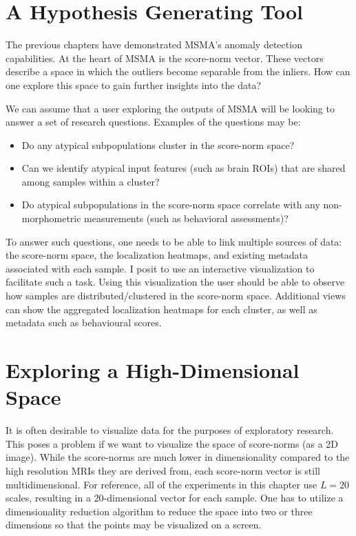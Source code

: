 \section{A Hypothesis Generating Tool}

The previous chapters have demonstrated MSMA's anomaly detection capabilities. At the heart of MSMA is the score-norm vector. These vectors describe a space in which the outliers become separable from the inliers. How can one explore this space to gain further insights into the data?

We can assume that a user exploring the outputs of MSMA will be looking to answer a set of research questions. Examples of the questions may be:
\begin{itemize}
    \item Do any atypical subpopulations cluster in the score-norm space?
    \item Can we identify atypical input features (such as brain ROIs)  that are shared among samples within a cluster?
    \item Do atypical subpopulations in the score-norm space correlate with any non-morphometric measurements (such as behavioral assessments)?
\end{itemize}

To answer such questions, one needs to be able to link multiple sources of data: the score-norm space, the localization heatmaps, and existing metadata associated with each sample. I posit to use an interactive visualization to facilitate such a task.
Using this visualization the user should be able to observe how samples are distributed/clustered in the score-norm space. Additional views can show the aggregated localization heatmaps for each cluster, as well as metadata such as behavioural scores.


\section{Exploring a High-Dimensional Space}

It is often desirable to visualize data for the purposes of exploratory research. This poses a problem if we want to visualize the space of score-norms (as a 2D image). While the score-norms are much lower in dimensionality compared to the high resolution MRIs they are derived from, each score-norm vector is still multidimensional. For reference, all of the experiments in this chapter use $L=20$ scales, resulting in a 20-dimensional vector for each sample. One has to utilize a dimensionality reduction algorithm to reduce the space into two or three dimensions so that the points may be visualized on a screen.

